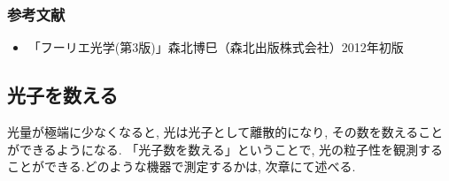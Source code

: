 \subsubsection{参考文献}
\begin{itemize}
  \item 「フーリエ光学(第3版)」森北博巳（森北出版株式会社）2012年初版
\end{itemize}

\subsection{光子を数える}
光量が極端に少なくなると, 光は光子として離散的になり, その数を数えることができるようになる.
「光子数を数える」ということで, 光の粒子性を観測することができる.どのような機器で測定するかは, 次章にて述べる.
